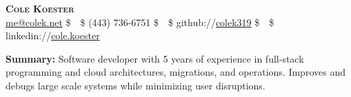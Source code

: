 \documentclass[letterpaper,11pt]{article}
\begin{document}
\begin{center}
\textbf{\LARGE\scshape Cole Koester} \\
\vspace{1pt}\small
\href{mailto:}{me@colek.net}
\$\ \diamond\ \$
(443) 736-6751
\$\ \diamond\ \$
github://\href{https://github.com/}{colek319}
\$\ \diamond\ \$
linkedin://\href{https://www.linkedin.com/}{cole.koester}
\end{center}

\noindent\begin{minipage}{\textwidth}
\footnotesize
\textbf{Summary:} Software developer with 5 years of experience in full-stack programming and cloud architectures, migrations, and operations. Improves and debugs large scale systems while minimizing user disruptions.
\end{minipage}
\end{document}
